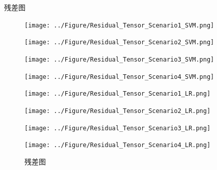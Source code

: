 \documentclass{beamer}
\begin{document}
	\begin{frame}{残差图}
		\begin{figure}[h]
			\centering
			\begin{minipage}{0.24\textwidth}
				\centering
				\texttt{[image: ../Figure/Residual\_Tensor\_Scenario1\_SVM.png]}
				\label{fig:residual_scenario1_SVM}
			\end{minipage}
			\hfill
			\begin{minipage}{0.24\textwidth}
				\centering
				\texttt{[image: ../Figure/Residual\_Tensor\_Scenario2\_SVM.png]}
				\label{fig:residual_scenario2_SVM}
			\end{minipage}
			\hfill
			\begin{minipage}{0.24\textwidth}
				\centering
				\texttt{[image: ../Figure/Residual\_Tensor\_Scenario3\_SVM.png]}
				\label{fig:residual_scenario3_SVM}
			\end{minipage}
			\hfill
			\begin{minipage}{0.24\textwidth}
				\centering
				\texttt{[image: ../Figure/Residual\_Tensor\_Scenario4\_SVM.png]}
				\label{fig:residual_scenario4_SVM}
			\end{minipage}
			
			\begin{minipage}{0.24\textwidth}
				\centering
				\texttt{[image: ../Figure/Residual\_Tensor\_Scenario1\_LR.png]}
				\label{fig:residual_scenario1_LR}
			\end{minipage}
			\hfill
			\begin{minipage}{0.24\textwidth}
				\centering
				\texttt{[image: ../Figure/Residual\_Tensor\_Scenario2\_LR.png]}
				\label{fig:residual_scenario2_LR}
			\end{minipage}
			\hfill
			\begin{minipage}{0.24\textwidth}
				\centering
				\texttt{[image: ../Figure/Residual\_Tensor\_Scenario3\_LR.png]}
				\label{fig:residual_scenario3_LR}
			\end{minipage}
			\hfill
			\begin{minipage}{0.24\textwidth}
				\centering
				\texttt{[image: ../Figure/Residual\_Tensor\_Scenario4\_LR.png]}
				\label{fig:residual_scenario4_LR}
			\end{minipage}
			
			\caption{残差图}
			\label{fig:residual_maps_all}
		\end{figure}
	\end{frame}
\end{document}
